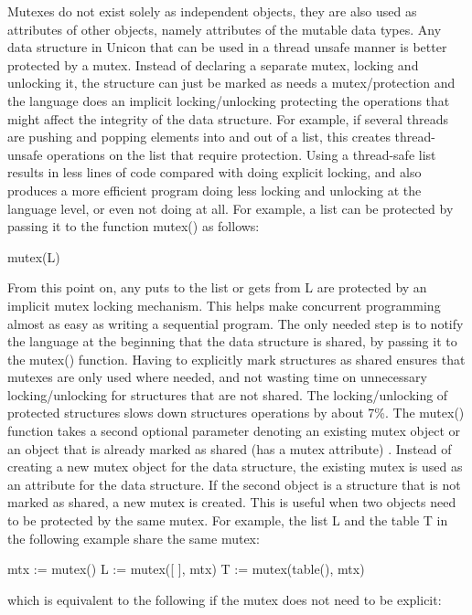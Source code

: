 Mutexes do not exist solely as independent objects, they are also used as attributes of other
objects, namely attributes of the mutable data types. Any data structure in Unicon that can be
used in a thread unsafe manner is better protected by a mutex. Instead of declaring a separate
mutex, locking and unlocking it, the structure can just be marked as needs a mutex/protection
and the language does an implicit locking/unlocking protecting the operations that might affect
the integrity of the data structure.  For example, if several threads are pushing and popping
elements into and out of a list, this creates thread-unsafe operations on the list that require
protection. 
Using a thread-safe list results in less lines of code compared with doing explicit locking, and
also produces a more efficient program doing less locking and unlocking at the language level,
or even not doing at all. For example, a list can be protected by passing it to the function
mutex() as follows:

\begin{iconcode}
   mutex(L)
\end{iconcode}

From this point on, any puts to the list or gets from L are protected by an implicit mutex locking
mechanism. This helps make concurrent programming almost as easy as writing a sequential program.
The only needed step is to notify the language at the beginning that the data structure is shared,
by passing it to the mutex() function. Having to explicitly mark structures as shared ensures that
mutexes are only used where needed, and not wasting time on unnecessary locking/unlocking for
structures that are not shared. The locking/unlocking of protected structures slows down structures
operations by about 7\%. The mutex() function takes a second optional parameter denoting an existing
mutex object or an object that is already marked as shared (has a mutex attribute) . Instead of
creating a new mutex object for the data structure, the existing mutex is used as an attribute for
the data structure. If the second object is a structure that is not marked as shared, a new mutex is
created. This is useful when two objects need to be protected by the same mutex. For example,
the list L and the table T in the following example share the same mutex:

\begin{iconcode}
mtx := mutex()
L := mutex([ ], mtx)
T := mutex(table(), mtx)
\end{iconcode}

which is equivalent to the following if the mutex does not need to be explicit:

